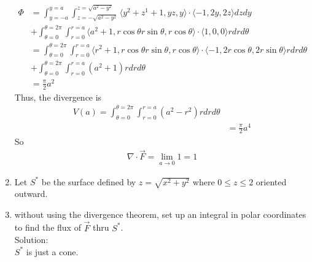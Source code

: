 \documentclass[11pt]{article}
\begin{document}
\begin{enumerate}
              \begin{align*}
                \Phi
                &= \int_{y=-a}^{y=a} \int_{z=-\sqrt{a^{2}-y^{2}}}^{z=\sqrt{a^{2}-y^{2}}} \langle y^{2}+z^{1}+1, yz, y \rangle \cdot \langle -1, 2y, 2z \rangle dz dy \\
                &+ \int_{\theta = 0}^{\theta = 2\pi} \int_{r = 0}^{r=a} \langle a^{2} + 1, r\cos\theta r\sin\theta, r\cos\theta \rangle \cdot \langle 1, 0, 0 \rangle r dr d\theta\\
                &= \int_{\theta = 0}^{\theta = 2\pi} \int_{r=0}^{r=a} \langle r^{2}+1, r\cos\theta r\sin\theta, r\cos\theta  \rangle \cdot \langle -1, 2r\cos\theta, 2r\sin\theta \rangle r dr d\theta \\
                &+ \int_{\theta = 0}^{\theta = 2\pi} \int_{r = 0}^{r=a} (a^{2}+1)r dr d\theta\\
                &= \frac{\pi}{2}a^{2}
              \end{align*}
              Thus, the divergence is
              \begin{align*}
                V(a) = \int_{\theta = 0}^{\theta = 2\pi}\int_{r = 0}^{r = a} (a^{2}-r^{2}) r dr d\theta \\
                &=\frac{\pi}{2}a^{4}
              \end{align*}
              So
              \begin{align*}
                \nabla \cdot \vec{F} = \lim_{a \to 0} 1 = 1
              \end{align*}
        \item Let $S^{*} $ be the surface defined by $z = \sqrt{x^{2} + y^{2}}$ where $0 \le z \le 2$ oriented outward.
        \item without using the divergence theorem, set up an integral in polar coordinates to find the flux of $\vec{F}$ thru $S^{*}$.\\
              Solution: \\
              $S^{*}$ is just a cone.


\end{enumerate}
\end{document}
